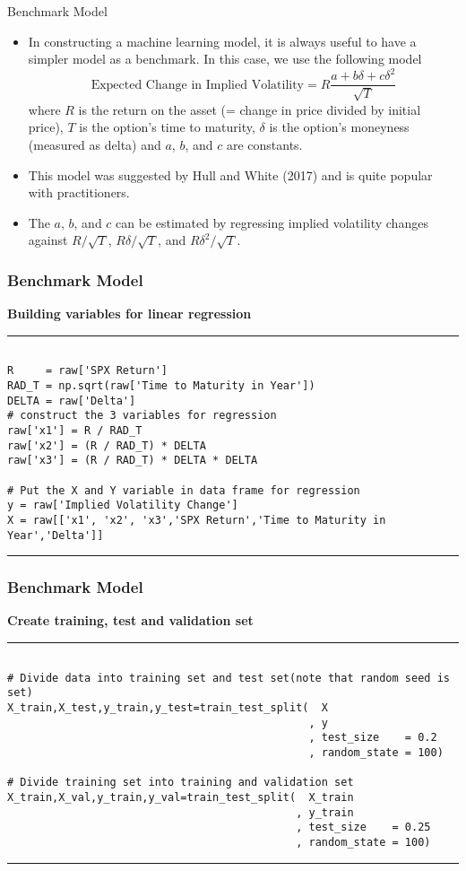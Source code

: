 \documentclass[11pt]{beamer}
\begin{document}
\begin{frame}{Benchmark Model}
\begin{itemize}
\item In constructing a machine learning model, it is always useful to have
a simpler model as a benchmark. In this case, we use the following model
\begin{equation}
\text{Expected Change in Implied Volatility} =R \frac{a+b\delta+c\delta^2}{\sqrt{T}}
\end{equation}
where $R$ is the return on the asset (= change in price divided by initial
price), $T$ is the option’s time to maturity, $\delta$ is the option’s moneyness
(measured as delta) and $a$, $b$, and $c$ are constants. 
\item This model was suggested
by Hull and White (2017) and is quite popular with practitioners.
\item The $a$, $b$, and $c$ can be estimated by regressing implied volatility changes
against $R/\sqrt{T}$, $R\delta/\sqrt{T}$, and $R\delta^2/\sqrt{T}$.
\end{itemize}
\end{frame}
\begin{frame}[fragile]
\frametitle{Benchmark Model}
\textbf{Building variables for linear regression}
\rule{\textwidth}{1pt}
\scriptsize
\begin{verbatim}

R     = raw['SPX Return']
RAD_T = np.sqrt(raw['Time to Maturity in Year'])
DELTA = raw['Delta']
# construct the 3 variables for regression
raw['x1'] = R / RAD_T
raw['x2'] = (R / RAD_T) * DELTA
raw['x3'] = (R / RAD_T) * DELTA * DELTA

# Put the X and Y variable in data frame for regression
y = raw['Implied Volatility Change']
X = raw[['x1', 'x2', 'x3','SPX Return','Time to Maturity in Year','Delta']]

\end{verbatim}
\rule{\textwidth}{1pt}
\end{frame}
\begin{frame}[fragile]
\frametitle{Benchmark Model}
\textbf{Create training, test and validation set}
\rule{\textwidth}{1pt}
\scriptsize
\begin{verbatim}

# Divide data into training set and test set(note that random seed is set)
X_train,X_test,y_train,y_test=train_test_split(  X
                                               , y
                                               , test_size    = 0.2
                                               , random_state = 100)

# Divide training set into training and validation set
X_train,X_val,y_train,y_val=train_test_split(  X_train
                                             , y_train
                                             , test_size    = 0.25
                                             , random_state = 100)
\end{verbatim}
\rule{\textwidth}{1pt}
\end{frame}
\end{document}
